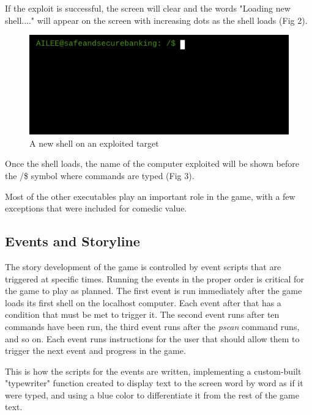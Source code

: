 \documentclass[conference]{IEEEtran}
\begin{document}
If the exploit is successful, the screen will clear and the words "Loading new shell...." will appear on the screen with increasing dots as the shell loads (Fig 2).

\begin{figure}[htbp]
	\centerline{\includegraphics[scale=2]{access-granted}}
	\caption{A new shell on an exploited target}
	\label{fig}
\end{figure}

Once the shell loads, the name of the computer exploited will be shown before the /\$ symbol where commands are typed (Fig 3).

Most of the other executables play an important role in the game, with a few exceptions that were included for comedic value.

\subsection{Events and Storyline}

The story development of the game is controlled by event scripts that are triggered at specific times. Running the events in the proper order is critical for the game to play as planned. The first event is run immediately after the game loads its first shell on the localhost computer. Each event after that has a condition that must be met to trigger it. The second event runs after ten commands have been run, the third event runs after the \textit{pscan} command runs, and so on. Each event runs instructions for the user that should allow them to trigger the next event and progress in the game.



This is how the scripts for the events are written, implementing a custom-built "typewriter" function created to display text to the screen word by word as if it were typed, and using a blue color to differentiate it from the rest of the game text. 
\end{document}

